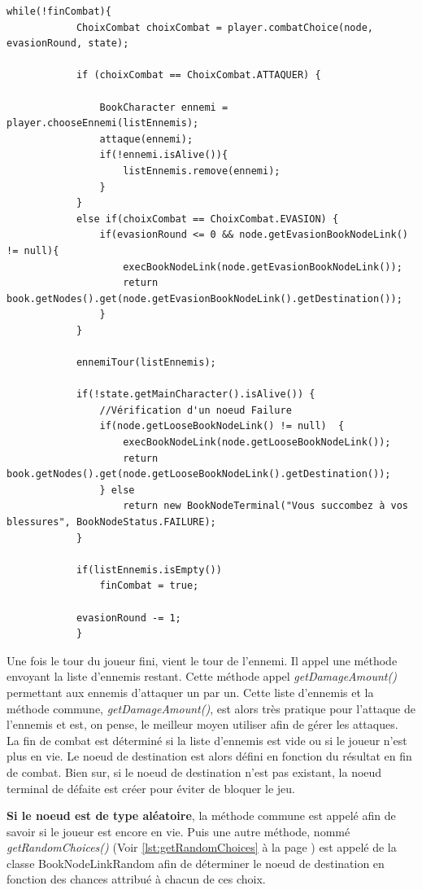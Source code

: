 		\begin{lstlisting}[caption=JeuCombat]
		while(!finCombat){
			ChoixCombat choixCombat = player.combatChoice(node, evasionRound, state);

			if (choixCombat == ChoixCombat.ATTAQUER) {

				BookCharacter ennemi = player.chooseEnnemi(listEnnemis);
				attaque(ennemi);
				if(!ennemi.isAlive()){
					listEnnemis.remove(ennemi);
				}
			}
			else if(choixCombat == ChoixCombat.EVASION) {
				if(evasionRound <= 0 && node.getEvasionBookNodeLink() != null){
					execBookNodeLink(node.getEvasionBookNodeLink());
					return book.getNodes().get(node.getEvasionBookNodeLink().getDestination());
				}
			}

			ennemiTour(listEnnemis);

			if(!state.getMainCharacter().isAlive()) {
				//Vérification d'un noeud Failure
				if(node.getLooseBookNodeLink() != null)  {
					execBookNodeLink(node.getLooseBookNodeLink());
					return book.getNodes().get(node.getLooseBookNodeLink().getDestination());
				} else
					return new BookNodeTerminal("Vous succombez à vos blessures", BookNodeStatus.FAILURE);
			}

			if(listEnnemis.isEmpty())
				finCombat = true;

			evasionRound -= 1;
			}
		\end{lstlisting}

		Une fois le tour du joueur fini, vient le tour de l'ennemi. Il appel une méthode envoyant la liste d'ennemis restant. Cette méthode appel \textit{getDamageAmount()} permettant aux ennemis d'attaquer un par un. Cette liste d'ennemis et la méthode commune, \textit{getDamageAmount()}, est alors très pratique pour l'attaque de l'ennemis et est, on pense, le meilleur moyen utiliser afin de gérer les attaques.\\

		La fin de combat est déterminé si la liste d'ennemis est vide ou si le joueur n'est plus en vie. Le noeud de destination est alors défini en fonction du résultat en fin de combat. Bien sur, si le noeud de destination n'est pas existant, la noeud terminal de défaite est créer pour éviter de bloquer le jeu.

		\textbf{Si le noeud est de type aléatoire}, la méthode commune est appelé afin de savoir si le joueur est encore en vie. Puis une autre méthode, nommé \textit{getRandomChoices()} (Voir \ref{lst:getRandomChoices} à la page \pageref{lst:getRandomChoices}) est appelé de la classe BookNodeLinkRandom afin de déterminer le noeud de destination en fonction des chances attribué à chacun de ces choix.

